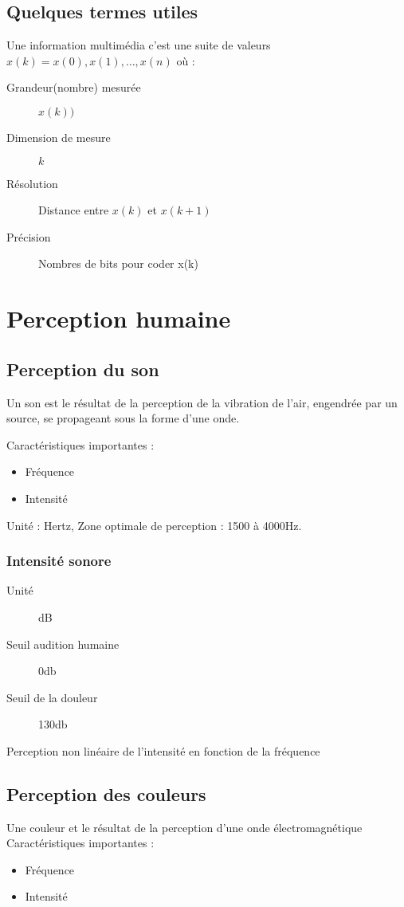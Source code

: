 \documentclass[12pt,a4paper,openany]{book}
\begin{document}
\section{Quelques termes utiles}
Une information multimédia c'est une suite de valeurs $x(k) = x(0), x(1), \ldots, x(n)$ où :
\begin{description}
	\item[Grandeur(nombre) mesurée] $x(k))$
	\item[Dimension de mesure] $k$
	\item[Résolution] Distance entre $x(k)$ et $x(k+1)$
	\item[Précision] Nombres de bits pour coder x(k)
\end{description}

	\chapter{Perception humaine}
\section{Perception du son}
\begin{definition}
	Un son est le résultat de la perception de la vibration de l'air, engendrée par un source, se propageant sous la forme d'une onde.
\end{definition}
	Caractéristiques importantes : 
	\begin{itemize}
		\item Fréquence
		\item Intensité
	\end{itemize}

	Unité : Hertz, Zone optimale de perception : 1500 à 4000Hz.
	\subsection{Intensité sonore}
	\begin{description}
		\item[Unité] dB
		\item[Seuil audition humaine] 0db
		\item[Seuil de la douleur] 130db
	\end{description}

	Perception non linéaire de l'intensité en fonction de la fréquence

	\section{Perception des couleurs}
	\begin{definition}
		Une couleur et le résultat de la perception d'une onde électromagnétique
	Caractéristiques importantes : 
	\begin{itemize}
		\item Fréquence
		\item Intensité
	\end{itemize}
	\end{definition}
\end{document}
